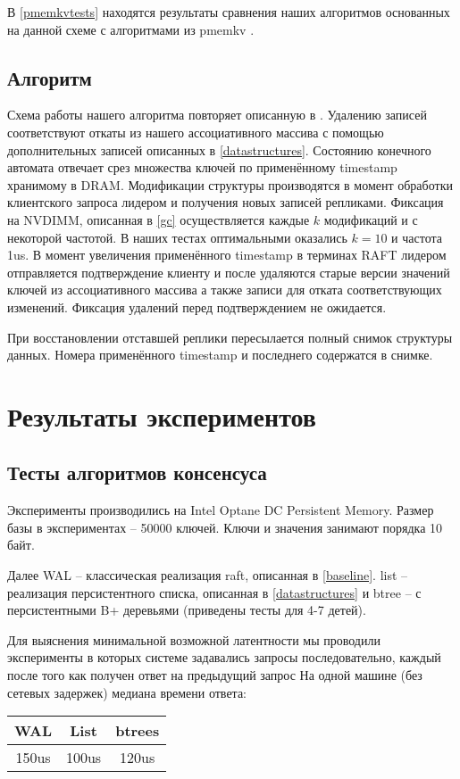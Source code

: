 \documentclass[pdftex,ptm,12pt,a4paper]{report}
\theoremstyle{definition}
\begin{document}
В \ref{pmemkvtests} находятся результаты сравнения наших алгоритмов основанных на данной схеме с алгоритмами из pmemkv \cite{pmemkv}.

\section{Алгоритм}
Схема работы нашего алгоритма повторяет описанную в \cite{raftpaper}. Удалению записей соответствуют откаты из нашего ассоциативного массива с помощью дополнительных записей описанных в \ref{datastructures}. Состоянию конечного автомата отвечает срез множества ключей по применённому timestamp хранимому в DRAM. Модификации структуры производятся в момент обработки
клиентского запроса лидером и получения новых записей репликами. Фиксация на NVDIMM, описанная в \ref{gc} осуществляется каждые $k$ модификаций и с некоторой частотой.
В наших тестах оптимальными оказались $k=10$ и частота 1us. В момент увеличения применённого timestamp в терминах RAFT лидером отправляется подтверждение клиенту и после удаляются
старые версии значений ключей из ассоциативного массива а также записи для отката соответствующих изменений. Фиксация удалений перед подтверждением не ожидается.

При восстановлении отставшей реплики пересылается полный снимок структуры данных. Номера применённого timestamp и последнего содержатся в снимке.

\chapter{Результаты экспериментов}
\section{Тесты алгоритмов консенсуса}
Эксперименты производились на Intel Optane DC Persistent Memory.
Размер базы в экспериментах -- 50000 ключей. Ключи и значения занимают порядка 10 байт.

Далее  WAL -- классическая реализация raft, описанная в \ref{baseline}. list -- реализация персистентного списка, описанная в \ref{datastructures}
и btree -- с персистентными B+ деревьями (приведены тесты для 4-7 детей).

Для выяснения минимальной возможной латентности мы проводили эксперименты в которых системе задавались запросы последовательно, каждый после того как получен ответ на предыдущий запрос
На одной машине (без сетевых задержек) медиана времени ответа:
\begin{center}
\begin{tabular} {|c c c|}
\hline
    WAL & List & btrees \\
    \hline
150us & 100us & 120us \\
\hline
\end{tabular}
\end{center}
\end{document}
